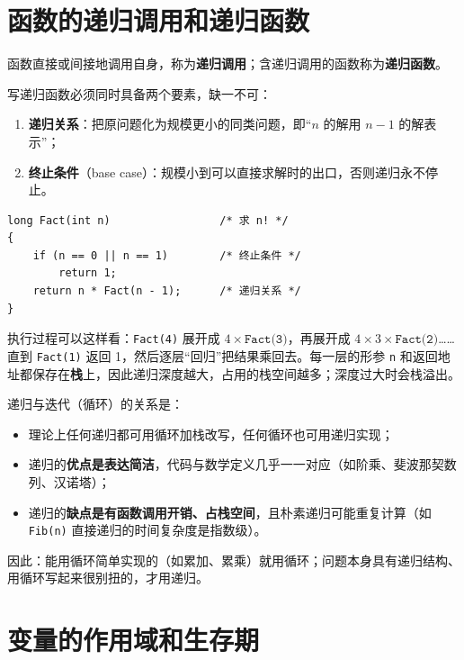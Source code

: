 \section{函数的递归调用和递归函数}

函数直接或间接地调用自身，称为\textbf{递归调用}；含递归调用的函数称为\textbf{递归函数}。

写递归函数必须同时具备两个要素，缺一不可：

\begin{enumerate}
  \item \textbf{递归关系}：把原问题化为规模更小的同类问题，即“$n$ 的解用 $n-1$ 的解表示”；
  \item \textbf{终止条件}（base case）：规模小到可以直接求解时的出口，否则递归永不停止。
\end{enumerate}

\begin{lstlisting}
long Fact(int n)                 /* 求 n! */
{
    if (n == 0 || n == 1)        /* 终止条件 */
        return 1;
    return n * Fact(n - 1);      /* 递归关系 */
}
\end{lstlisting}

执行过程可以这样看：\texttt{Fact(4)} 展开成 $4\times\texttt{Fact(3)}$，再展开成 $4\times3\times\texttt{Fact(2)}$……直到 \texttt{Fact(1)} 返回 1，然后逐层“回归”把结果乘回去。每一层的形参 \texttt{n} 和返回地址都保存在\textbf{栈}上，因此递归深度越大，占用的栈空间越多；深度过大时会栈溢出。

递归与迭代（循环）的关系是：

\begin{itemize}
  \item 理论上任何递归都可用循环加栈改写，任何循环也可用递归实现；
  \item 递归的\textbf{优点是表达简洁}，代码与数学定义几乎一一对应（如阶乘、斐波那契数列、汉诺塔）；
  \item 递归的\textbf{缺点是有函数调用开销、占栈空间}，且朴素递归可能重复计算（如 \texttt{Fib(n)} 直接递归的时间复杂度是指数级）。
\end{itemize}

因此：能用循环简单实现的（如累加、累乘）就用循环；问题本身具有递归结构、用循环写起来很别扭的，才用递归。


\section{变量的作用域和生存期}

